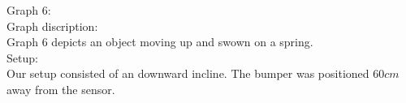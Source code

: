 \documentclass[12pt, letterpaper]{article}
\begin{document}
  \large{Graph 6:}\\
  \large{Graph discription:}\\
  Graph 6 depicts an object moving up and swown on a spring.\\
  \large{Setup:}\\
  Our setup consisted of an downward incline. The bumper was positioned $60cm$ away from the sensor.  









\end{document}
